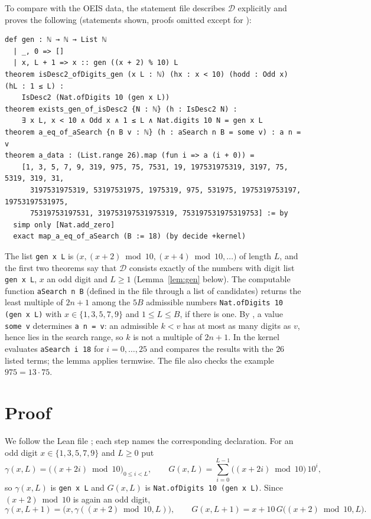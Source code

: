 \documentclass[11pt]{amsart}
\theoremstyle{plain}
\theoremstyle{definition}
\newcommand{\cD}{\mathcal{D}}
\begin{document}
To compare  with the OEIS data, the statement file describes $\cD$ explicitly and proves the following (statements shown, proofs omitted except for ):
\begin{lstlisting}
def gen : ℕ → ℕ → List ℕ
  | _, 0 => []
  | x, L + 1 => x :: gen ((x + 2) % 10) L
theorem isDesc2_ofDigits_gen (x L : ℕ) (hx : x < 10) (hodd : Odd x) (hL : 1 ≤ L) :
    IsDesc2 (Nat.ofDigits 10 (gen x L))
theorem exists_gen_of_isDesc2 {N : ℕ} (h : IsDesc2 N) :
    ∃ x L, x < 10 ∧ Odd x ∧ 1 ≤ L ∧ Nat.digits 10 N = gen x L
theorem a_eq_of_aSearch {n B v : ℕ} (h : aSearch n B = some v) : a n = v
theorem a_data : (List.range 26).map (fun i => a (i + 0)) =
    [1, 3, 5, 7, 9, 319, 975, 75, 7531, 19, 197531975319, 3197, 75, 5319, 319, 31,
      3197531975319, 53197531975, 1975319, 975, 531975, 1975319753197, 19753197531975,
      75319753197531, 319753197531975319, 753197531975319753] := by
  simp only [Nat.add_zero]
  exact map_a_eq_of_aSearch (B := 18) (by decide +kernel)
\end{lstlisting}
The list \texttt{gen x L} is $\bigl(x,(x+2)\bmod10,(x+4)\bmod10,\dots\bigr)$ of length $L$, and the first two theorems say that $\cD$ consists exactly of the numbers with digit list \texttt{gen x L}, $x$ an odd digit and $L\ge1$ (Lemma~\ref{lem:gen} below). The computable function \texttt{aSearch n B} (defined in the file through a list  of candidates) returns the least multiple of $2n+1$ among the $5B$ admissible numbers \texttt{Nat.ofDigits 10 (gen x L)} with $x\in\{1,3,5,7,9\}$ and $1\le L\le B$, if there is one. By , a value \texttt{some v} determines \texttt{a n = v}: an admissible $k<v$ has at most as many digits as $v$, hence lies in the search range, so $k$ is not a multiple of $2n+1$. In  the kernel evaluates \texttt{aSearch i 18} for $i=0,\dots,25$ and compares the results with the $26$ listed terms; the lemma  applies  termwise. The file also checks the example $975=13\cdot75$.

\section{Proof}\label{sec:proof}

We follow the Lean file ; each step names the corresponding declaration. For an odd digit $x\in\{1,3,5,7,9\}$ and $L\ge0$ put
\[
  \gamma(x,L)=\bigl((x+2i)\bmod 10\bigr)_{0\le i<L},\qquad G(x,L)=\sum_{i=0}^{L-1}\bigl((x+2i)\bmod 10\bigr)\,10^i ,
\]
so $\gamma(x,L)$ is \texttt{gen x L} and $G(x,L)$ is \texttt{Nat.ofDigits 10 (gen x L)}. Since $(x+2)\bmod10$ is again an odd digit,
\begin{equation}\label{eq:rec}
  \gamma(x,L+1)=\bigl(x,\gamma((x+2)\bmod 10,L)\bigr),\qquad G(x,L+1)=x+10\,G\bigl((x+2)\bmod 10,L\bigr).
\end{equation}
\end{document}
